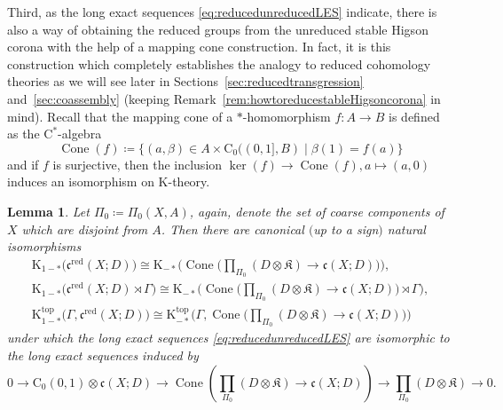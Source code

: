 \documentclass[pdftex]{sigma}
\numberwithin{equation}{section}
\newtheorem{lem}[thm]{Lemma}
\theoremstyle{definition}
\newcommand{\Ct}{\mathrm{C}}
\newcommand{\Cz}{\Ct_0}
\DeclareMathOperator{\Cone}{Cone}
\newcommand{\K}{\mathrm{K}}
\newcommand{\Ktop}{\mathrm{K}^{\mathrm{top}}}
\newcommand{\textCstar}{\ensuremath{\mathrm{C}^*\!}}
\newcommand{\sHigCor}{\mathfrak{c}}
\newcommand{\sHigCorRed}{\mathfrak{c}^{\mathrm{red}}}
\newcommand{\Kom}{{\mathfrak{K}}}
\newcommand{\coarsecomp}{\Pi_0}
\begin{document}
Third, as the long exact sequences \eqref{eq:reducedunreducedLES} indicate, there is also a way of obtaining the reduced groups from the unreduced stable Higson corona with the help of a mapping cone construction. In fact, it is this construction which completely establishes the analogy to reduced cohomology theories as we will see later in Sections~\ref{sec:reducedtransgression} and~\ref{sec:coassembly} (keeping Remark~\ref{rem:howtoreducestableHigsoncorona} in mind).
Recall that the mapping cone of a $*$-homomorphism $f\colon A \to B$ is defined as the \textCstar-algebra
\[
\Cone(f)\coloneqq \{(a,\beta)\in A\times \Cz((0,1],B)\mid \beta(1)=f(a)\}
\]
and if $f$ is surjective, then the inclusion $\ker(f)\to\Cone(f),a\mapsto (a,0)$ induces an isomorphism on $\K$-theory.
\begin{lem}\label{lem:reducedunreducedstablehigsoncoronacone}
Let $\coarsecomp\coloneqq\coarsecomp(X,A)$, again, denote the set of coarse components of $X$ which are disjoint from $A$.
Then there are canonical $($up to a sign$)$ natural isomorphisms
\begin{gather*}
\K_{1-*}\big(\sHigCorRed(X;D)\big)\cong\K_{-*}\big(\Cone\big(\textstyle\prod_{\coarsecomp}(D\otimes\Kom)\to\sHigCor(X;D)\big)\big),
\\
\K_{1-*}\big(\sHigCorRed(X;D)\rtimes\Gamma\big)\cong\K_{-*} \big(\Cone\big(\textstyle\prod_{\coarsecomp}(D\otimes\Kom)\to\sHigCor(X;D)\big)\rtimes\Gamma\big),
\\
\Ktop_{1-*}\big(\Gamma,\sHigCorRed(X;D)\big)\cong\Ktop_{-*} \big(\Gamma,\Cone\big(\textstyle\prod_{\coarsecomp}(D\otimes\Kom)\to\sHigCor(X;D)\big)\big)
\end{gather*}
under which the long exact sequences \eqref{eq:reducedunreducedLES} are isomorphic to the long exact sequences induced by
\[
0\to\Cz(0,1)\otimes\sHigCor(X;D)\to \Cone(\textstyle\prod_{\coarsecomp}(D\otimes\Kom)\to\sHigCor(X;D))\to \textstyle\prod_{\coarsecomp}(D\otimes\Kom)\to 0.
\]
\end{lem}
\end{document}
